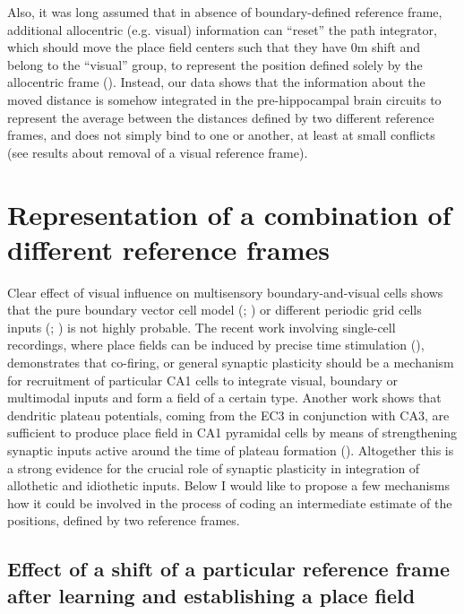 Also, it was long assumed that in absence of boundary-defined reference frame, additional allocentric (e.g. visual) information can “reset” the path integrator, which should move the place field centers such that they have 0m shift and belong to the “visual” group, to represent the position defined solely by the allocentric frame (\cite{Savelli2008}). Instead, our data shows that the information about the moved distance is somehow integrated in the pre-hippocampal brain circuits to represent the average between the distances defined by two different reference frames, and does not simply bind to one or another, at least at small conflicts (see results about removal of a visual reference frame).


\section{Representation of a combination of different reference frames}
\label{sec:integration_two_frames}

Clear effect of visual influence on multisensory boundary-and-visual cells shows that the pure boundary vector cell model (\cite{Barry2006}; \cite{Grieves2018}) or different periodic grid cells inputs (\cite{OKeefe2005}; \cite{Rolls2006}) is not highly probable. The recent work involving single-cell recordings, where place fields can be induced by precise time stimulation (\cite{Zhao2020}), demonstrates that co-firing, or general synaptic plasticity should be a mechanism for recruitment of particular CA1 cells to integrate visual, boundary or multimodal inputs and form a field of a certain type. Another work shows that dendritic plateau potentials, coming from the EC3 in conjunction with CA3, are sufficient to produce place field in CA1 pyramidal cells by means of strengthening synaptic inputs active around the time of plateau formation (\cite{Bittner2015}). Altogether this is a strong evidence for the crucial role of synaptic plasticity in integration of allothetic and idiothetic inputs. Below I would like to propose a few mechanisms how it could be involved in the process of coding an intermediate estimate of the positions, defined by two reference frames.


\subsection{Effect of a shift of a particular reference frame after learning and establishing a place field}

